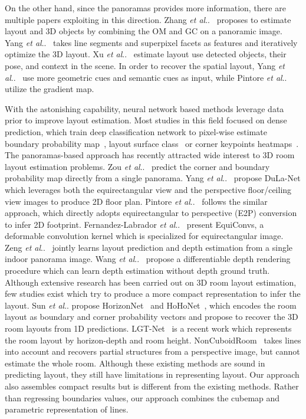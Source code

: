 \documentclass[runningheads]{llncs}
\makeatletter
\DeclareRobustCommand\onedot{\futurelet\@let@token\@onedot}
\def\@onedot{\ifx\@let@token.\else.\null\fi\xspace}
\def\etal{\emph{et al}\onedot}
\makeatother
\begin{document}
On the other hand, since the  panoramas provides more information, there are multiple papers exploiting in this direction. Zhang \etal~\cite{zhang2014panocontext} proposes to estimate layout and 3D objects by combining the OM and GC on a panoramic image.
Yang \etal~\cite{yang2016efficient} takes line segments and superpixel facets as features and iteratively optimize the 3D layout.
Xu \etal~\cite{xu2017pano2cad} estimate layout use detected objects, their pose, and context in the scene.
In order to recover the spatial layout, Yang \etal~\cite{yang2018automatic} use more geometric cues and semantic cues as input, while Pintore \etal~\cite{pintore2016omnidirectional} utilize the gradient map.

With the astonishing capability, neural network based methods leverage data prior to improve layout estimation. Most studies in this field focused on dense prediction, which train deep classification network to pixel-wise estimate boundary probability map~\cite{mallya2015learning,ren2016coarse,zhao2017physics}, layout surface class~\cite{dasgupta2016delay,izadinia2017im2cad} or corner keypoints heatmaps~\cite{lee2017roomnet,fernandez2020corners}. 
The panoramas-based approach has recently attracted wide interest to 3D room layout estimation problems. Zou \etal~\cite{zou2018layoutnet} predict the corner and boundary probability map directly from a single panorama. Yang \etal~\cite{yang2019dula} propose DuLa-Net which leverages both the equirectangular view and the perspective floor/ceiling view images to produce 2D floor plan. Pintore \etal~\cite{pintore2020atlantanet} follows the similar approach, which directly adopts equirectangular to perspective (E2P) conversion to infer 2D footprint. Fernandez-Labrador \etal~\cite{fernandez2020corners} present EquiConvs, a deformable convolution kernel which is specialized for equirectangular image. Zeng \etal~\cite{zeng2020joint} jointly learns layout prediction and depth estimation from a single indoor panorama image. Wang \etal~\cite{Wang_2021_LED2Net} propose a differentiable depth rendering procedure which can learn depth estimation without depth ground truth.
Although extensive research has been carried out on 3D room layout estimation, few studies exist which try to produce a more compact representation to infer the layout. Sun \etal propose HorizonNet~\cite{sun2019horizonnet} and HoHoNet~\cite{Sun_2021_HoHoNet}, which encodes the room layout as boundary and corner probability vectors and propose to recover the 3D room layouts from 1D predictions. 
LGT-Net~\cite{jiang2022lgt} is a recent work which represents the room layout by horizon-depth and room height. NonCuboidRoom~\cite{yang2022learning} takes lines into account and recovers partial structures from a perspective image, but cannot estimate the whole room.
Although these existing methods are sound in predicting layout, they still have limitations in representing layout.
Our approach also assembles compact results but is different from the existing methods. Rather than regressing boundaries values, our approach combines the cubemap and parametric representation of lines.
\end{document}
